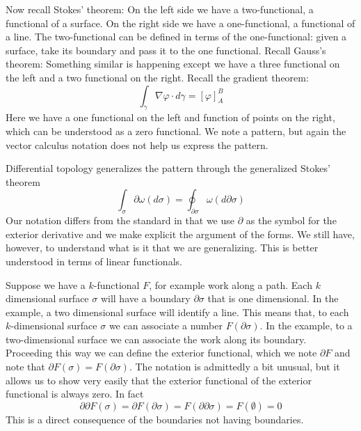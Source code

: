 \documentclass[10pt,twocolumn, nofootinbib]{revtex4-2}
\begin{document}

Now recall Stokes' theorem:
On the left side we have a two-functional, a functional of a surface. On the right side we have a one-functional, a functional of a line. The two-functional can be defined in terms of the one-functional: given a surface, take its boundary and pass it to the one functional. Recall Gauss's theorem:
Something similar is happening except we have a three functional on the left and a two functional on the right. Recall the gradient theorem:
\begin{equation*}
	\int_\gamma \nabla \varphi \cdot d\gamma = \left[ \varphi \right]_A^B
\end{equation*}
Here we have a one functional on the left and function of points on the right, which can be understood as a zero functional. We note a pattern, but again the vector calculus notation does not help us express the pattern.

Differential topology generalizes the pattern through the generalized Stokes' theorem
\begin{equation*}
	\int_\sigma \partial \omega(d\sigma) = \oint_{\partial \sigma} \omega(d\partial\sigma)
\end{equation*}
Our notation differs from the standard in that we use $\partial$ as the symbol for the exterior derivative and we make explicit the argument of the forms. We still have, however, to understand what is it that we are generalizing. This is better understood in terms of linear functionals.

Suppose we have a $k$-functional $F$, for example work along a path. Each $k$ dimensional surface $\sigma$ will have a boundary $\partial \sigma$ that is one dimensional. In the example, a two dimensional surface will identify a line. This means that, to each $k$-dimensional surface $\sigma$ we can associate a number $F(\partial \sigma)$. In the example, to a two-dimensional surface we can associate the work along its boundary. Proceeding this way we can define the exterior functional, which we note $\partial F$ and note that $\partial F(\sigma) = F(\partial \sigma)$. The notation is admittedly a bit unusual, but it allows us to show very easily that the exterior functional of the exterior functional is always zero. In fact
\begin{equation*}
	\partial \partial F(\sigma) = \partial F(\partial \sigma) = F(\partial \partial \sigma) = F(\emptyset) = 0
\end{equation*}
This is a direct consequence of the boundaries not having boundaries.
\end{document}

